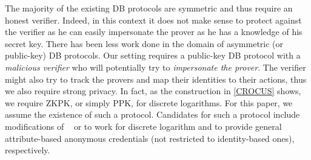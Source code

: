 The majority of the existing \ac{DB} protocols are symmetric and thus require an honest verifier.
Indeed, in this context it does not make sense to protect against the verifier as he can easily impersonate the prover as he has a knowledge of his secret key.
There has been less work done in the domain of asymmetric (or public-key) \ac{DB} protocols.
Our setting requires a public-key \ac{DB} protocol with a \emph{malicious verifier} who will potentially try to \emph{impersonate the prover}.
The verifier might also try to track the provers and map their identities to 
their actions, thus we also require strong privacy.
In fact, as the construction in \cref{CROCUS} shows, we require  
\ac{ZKPK}, or simply \ac{PPK}, for discrete logarithms.
For this paper, we assume the existence of such a protocol. Candidates for such a protocol include modifications of ~\cite{ProProx} or \cite{PROPS} to work for discrete logarithm and to provide general attribute-based anonymous credentials (not restricted to identity-based ones), respectively.

